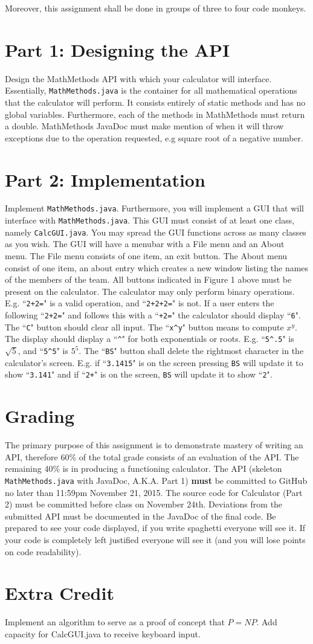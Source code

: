 \documentclass[]{simple}
\begin{document}
Moreover, this assignment shall be done in groups of three to four code monkeys.

\section{Part 1: Designing the API}
Design the MathMethods API with which your calculator will interface.
Essentially, \verb|MathMethods.java| is the container for all mathematical operations that the calculator will perform.
It consists entirely of static methods and has no global variables.
Furthermore, each of the methods in MathMethods must return a double.
MathMethods JavaDoc must make mention of when it will throw exceptions due to the operation requested, e.g square root of a negative number.

\section{Part 2: Implementation}
Implement \verb|MathMethods.java|.
Furthermore, you will implement a GUI that will interface with \verb|MathMethods.java|.
This GUI must consist of at least one class, namely \verb|CalcGUI.java|.
You may spread the GUI functions across as many classes as you wish.
The GUI will have a menubar with a File menu and an About menu.
The File menu consists of one item, an exit button.
The About menu consist of one item, an about entry which creates a new window listing the names of the members of the team.
All buttons indicated in Figure 1 above must be present on the calculator.
The calculator may only perform binary operations. 
E.g. ``\verb|2+2=|" is a valid operation, and ``\verb|2+2+2=|" is not.
If a user enters the following ``\verb|2+2=|" and follows this with a ``\verb|+2=|" the calculator should display ``\verb|6|".
The ``\verb|C|" button should clear all input.
The ``\verb|x^y|" button means to compute $x^y$.
The display should display a ``\verb|^|" for both exponentials or roots.
E.g. ``\verb|5^.5|" is $\sqrt{5}$, and ``\verb|5^5|" is $5^{5}$.
The ``\verb|BS|" button shall delete the rightmost character in the calculator's screen.
E.g. if ``\verb|3.1415|" is on the screen pressing \verb|BS| will update it to show ``\verb|3.141|" and if ``\verb|2+|" is on the screen, \verb|BS| will update it to show ``\verb|2|".

\section {Grading}
The primary purpose of this assignment is to demonstrate mastery of writing an API, therefore 60\% of the total grade consists of an evaluation of the API.
The remaining 40\% is in producing a functioning calculator.
The API (skeleton \verb|MathMethods.java| with JavaDoc, A.K.A. Part 1) \textbf{must} be committed to GitHub no later than 11:59pm November 21, 2015.
The source code for Calculator (Part 2) must be committed before class on November 24th.
Deviations from the submitted API must be documented in the JavaDoc of the final code.
Be prepared to see your code displayed, if you write spaghetti everyone will see it.
If your code is completely left justified everyone will see it (and you will lose points on code readability).

\section{Extra Credit}
Implement an algorithm to serve as a proof of concept that $P=NP$.
Add capacity for CalcGUI.java to receive keyboard input.
\end{document}
